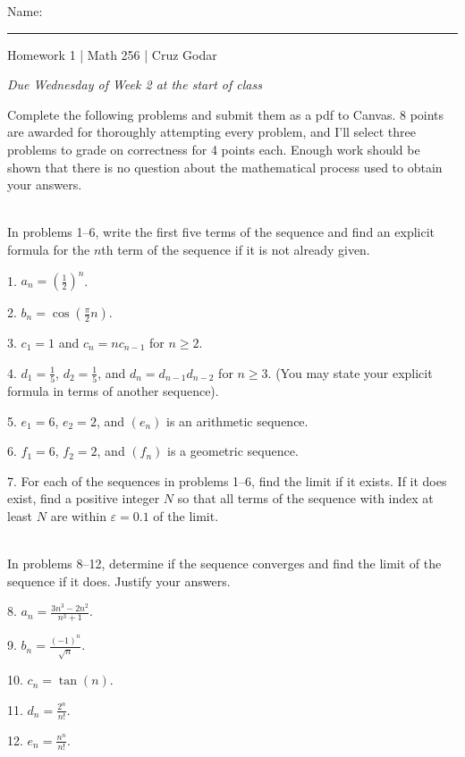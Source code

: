 \documentclass{article}
\begin{document}
\Large Name: \rule{2in}{0.15mm} \hfill Homework 1 | Math 256 | Cruz Godar \vspace{4pt} \normalsize

\textit{Due Wednesday of Week 2 at the start of class}

Complete the following problems and submit them as a pdf to Canvas. 8 points are awarded for thoroughly attempting every problem, and I'll select three problems to grade on correctness for 4 points each. Enough work should be shown that there is no question about the mathematical process used to obtain your answers. 

~\\

In problems 1--6, write the first five terms of the sequence and find an explicit formula for the $n$th term of the sequence if it is not already given.

1. $\displaystyle a_n = \left( \frac{1}{2} \right)^n$.

2. $\displaystyle b_n = \cos\left( \frac{\pi}{2} n \right)$.

3. $\displaystyle c_1 = 1$ and $\displaystyle c_n = nc_{n - 1}$ for $n \geq 2$.

4. $\displaystyle d_1 = \frac{1}{5}$, $\displaystyle d_2 = \frac{1}{5}$, and $d_n = d_{n - 1}d_{n - 2}$ for $n \geq 3$. (You may state your explicit formula in terms of another sequence).

5. $e_1 = 6$, $e_2 = 2$, and $(e_n)$ is an arithmetic sequence.

6. $f_1 = 6$, $f_2 = 2$, and $(f_n)$ is a geometric sequence.

7. For each of the sequences in problems 1--6, find the limit if it exists. If it does exist, find a positive integer $N$ so that all terms of the sequence with index at least $N$ are within $\varepsilon = 0.1$ of the limit.

~\\

In problems 8--12, determine if the sequence converges and find the limit of the sequence if it does. Justify your answers.

8. $\displaystyle a_n = \frac{3n^3 - 2n^2}{n^3 + 1}$.

9. $\displaystyle b_n = \frac{(-1)^n}{\sqrt{n}}$.

10. $\displaystyle c_n = \tan(n)$.

11. $\displaystyle d_n = \frac{2^n}{n!}$.

12. $\displaystyle e_n = \frac{n^n}{n!}$.
\end{document}
